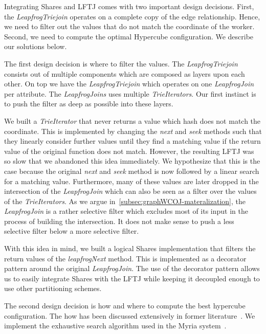 Integrating Shares and \textsc{LFTJ} comes with two important design decisions.
First, the \textit{LeapfrogTriejoin} operates on a complete copy of the edge relationship.
Hence, we need to filter out the values that do not match the coordinate of the worker.
Second, we need to compute the optimal Hypercube configuration.
We describe our solutions below.

The first design decision is where to filter the values.
The \textit{LeapfrogTriejoin} consists out of multiple components which are composed as layers upon each other.
On top we have the \textit{LeapfrogTriejoin} which operates on one \textit{LeapfrogJoin} per attribute.
The \textit{LeapfrogJoins} uses multiple \textit{TrieIterators}.
Our first instinct is to push the filter as deep as possible into these layers.

We built a \textit{TrieIterator} that never returns a value which hash does not match the coordinate.
This is implemented by changing the \textit{next} and \textit{seek} methods such that they linearly
consider further values until they find a matching value if the return value of the original function does not match.
However, the resulting \textsc{LFTJ} was so slow that we abandoned this idea immediately.
We hypothesize that this is the case because the original \textit{next} and \textit{seek} method is now followed
by a linear search for a matching value.
Furthermore, many of these values are later dropped in the intersection of the \textit{LeapfrogJoin} which
can also be seen as a filter over the values of the \textit{TrieIterators}.
As we argue in~\cref{subsec:graphWCOJ-materalization}, the \textit{LeapfrogJoin} is a rather selective filter which
excludes most of its input in the process of building the intersection.
It does not make sense to push a less selective filter below a more selective filter.

With this idea in mind, we built a logical Shares implementation that filters the return values of the \textit{leapfrogNext}
method.
This is implemented as a decorator pattern around the original \textit{LeapfrogJoin}.
The use of the decorator pattern allows us to easily integrate Shares with the \textsc{LFTJ} while keeping it decoupled enough
to use other partitioning schemes.

The second design decision is how and where to compute the best hypercube configuration.
The how has been discussed extensively in former literature~\cite{shares,myria-detailed,shares-proof,shares-skew}.
We implement the exhaustive search algorithm used in the Myria system~\cite{myria-detailed}.

